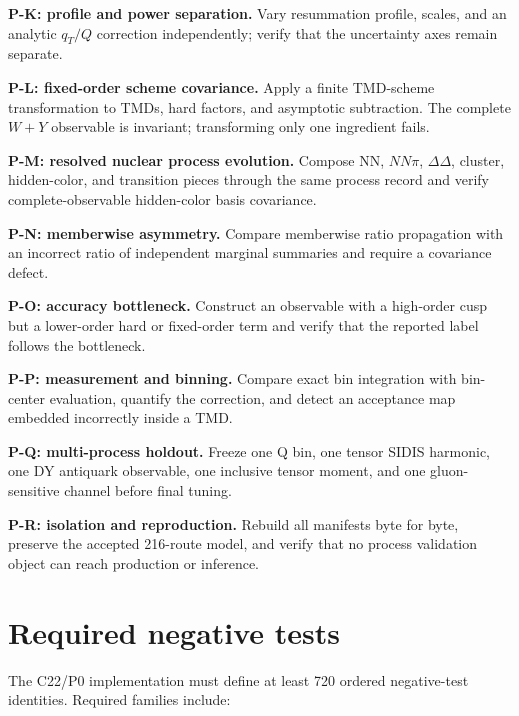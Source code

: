 \documentclass[11pt]{article}
\begin{document}
\textbf{P-K: profile and power separation.}
Vary resummation profile, scales, and an analytic \(q_T/Q\) correction independently; verify that the uncertainty axes remain separate.

\textbf{P-L: fixed-order scheme covariance.}
Apply a finite TMD-scheme transformation to TMDs, hard factors, and asymptotic subtraction.  The complete \(W+Y\) observable is invariant; transforming only one ingredient fails.

\textbf{P-M: resolved nuclear process evolution.}
Compose NN, \(NN\pi\), \(\Delta\Delta\), cluster, hidden-color, and transition pieces through the same process record and verify complete-observable hidden-color basis covariance.

\textbf{P-N: memberwise asymmetry.}
Compare memberwise ratio propagation with an incorrect ratio of independent marginal summaries and require a covariance defect.

\textbf{P-O: accuracy bottleneck.}
Construct an observable with a high-order cusp but a lower-order hard or fixed-order term and verify that the reported label follows the bottleneck.

\textbf{P-P: measurement and binning.}
Compare exact bin integration with bin-center evaluation, quantify the correction, and detect an acceptance map embedded incorrectly inside a TMD.

\textbf{P-Q: multi-process holdout.}
Freeze one Q bin, one tensor SIDIS harmonic, one DY antiquark observable, one inclusive tensor moment, and one gluon-sensitive channel before final tuning.

\textbf{P-R: isolation and reproduction.}
Rebuild all manifests byte for byte, preserve the accepted 216-route model, and verify that no process validation object can reach production or inference.

\section{Required negative tests}
\label{sec:negative}

The C22/P0 implementation must define at least 720 ordered negative-test identities.  Required families include:
\end{document}

